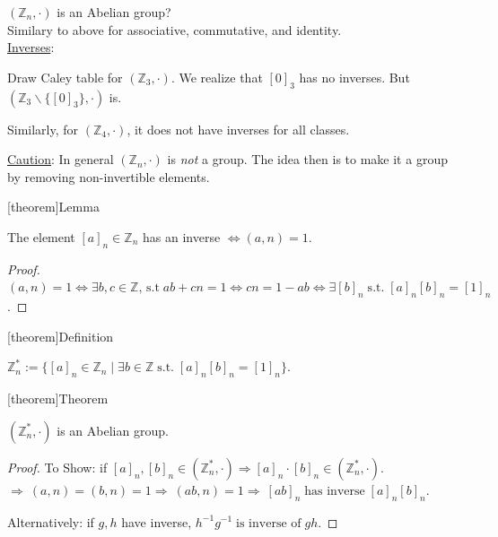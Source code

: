 \documentclass[12pt]{report}
\theoremstyle{definition}
\begin{document}
\begin{ex}
    $(\mathbb{Z}_n, \cdot)$ is an Abelian group?
    \\Similary to above for associative, commutative, and identity.
    \\\underline{Inverses}:

    Draw Caley table for $(\mathbb{Z}_3, \cdot)$.
    We realize that ${[0]}_{3}$ has no inverses.
    But $(\mathbb{Z}_3 \backslash \{{[0]}_{3}\}, \cdot)$ is.

    Similarly, for $(\mathbb{Z}_4, \cdot)$, it does not have inverses for all classes.

    \underline{Caution}: In general $(\mathbb{Z}_n, \cdot)$ is \emph{not}  a group.
    The idea then is to make it a group by removing non-invertible elements.
\end{ex}

[theorem]{Lemma}
\begin{equivalence class inverse}
    The element ${[a]}_{n} \in \mathbb{Z}_n$ has an inverse $\iff (a, n) = 1$.
\end{equivalence class inverse}

\begin{proof}
    $(a, n) = 1 \iff \exists b, c \in \mathbb{Z}, \,\text{s.t}\; ab + cn = 1
    \iff cn = 1 - ab \iff \exists {[b]}_{n} \;\text{s.t.}\;
    {[a]}_{n}{[b]}_{n} = {[1]}_{n}$.
\end{proof}

[theorem]{Definition}
\begin{invertible equivalence class}
    $\mathbb{Z}_n^{*} := \{ {[a]}_{n} \in \mathbb{Z}_n \;|\; \exists b \in \mathbb{Z}
    \;\text{s.t.}\; {[a]}_{n}{[b]}_{n} = {[1]}_{n}\}$.
\end{invertible equivalence class}

[theorem]{Theorem}
\begin{special equivalence class is Abelian}
    $(\mathbb{Z}_n^{*}, \cdot)$ is an Abelian group.
\end{special equivalence class is Abelian}

\begin{proof}
    To Show: if ${[a]}_{n}, {[b]}_{n} \in (\mathbb{Z}_n^{*}, \cdot) 
    \Rightarrow {[a]}_{n} \cdot {[b]}_{n} \in (\mathbb{Z}_n^{*}, \cdot)$.
    \\$\Rightarrow\ (a, n) = (b, n) = 1 \Rightarrow\ (ab, n) = 1
    \Rightarrow\ {[ab]}_{n} \;\text{has inverse}\; {[a]}_{n} {[b]}_{n}$.

    Alternatively: if $g, h$ have inverse, $h^{-1}g^{-1} \;\text{is inverse of}\; gh$.
\end{proof}
\end{document}

